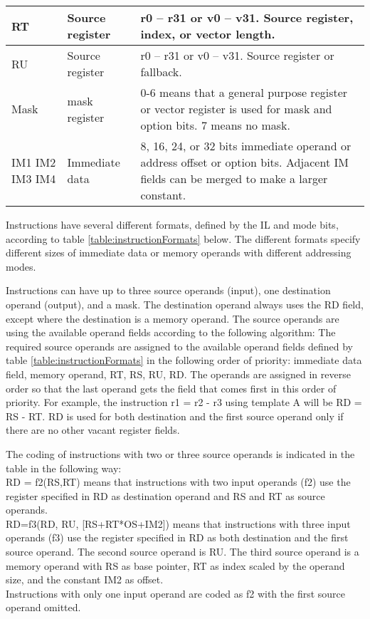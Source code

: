 \documentclass[forwardcom.tex]{subfiles}
\begin{document}
\begin{longtable} {|p{16mm}|p{16mm}|p{85mm}|}
\hline
RT & Source register & r0 – r31 or v0 – v31. Source register, index, or vector length.  \\
\hline
RU & Source register & r0 – r31 or v0 – v31. Source register or fallback. \\
\hline
Mask & mask register & 0-6 means that a general purpose register or vector register is used for mask and option bits. 7 means no mask.  \\
\hline
IM1 IM2 IM3 IM4 & Immediate data & 8, 16, 24, or 32 bits immediate operand or address offset or option bits. Adjacent IM fields can be merged to make a larger constant. \\
\hline
\end{longtable}
\vv

Instructions have several different formats, defined by the IL and mode bits, according to  table \ref{table:instructionFormats} below. The different formats specify different sizes of immediate data or memory operands with different addressing modes. \\
\vv

Instructions can have up to three source operands (input), one destination operand (output), and a mask. The destination operand always uses the RD field, except where the destination is a memory operand. The source operands are using the available operand fields according to the following algorithm: The required source operands are assigned to the available
operand fields defined by table \ref{table:instructionFormats} in the following order of priority: immediate data field, memory operand, RT, RS, RU, RD. 
The operands are assigned in reverse order so that the last operand gets the field that comes first in this order of priority. For example, the instruction r1 = r2 - r3 using template A will be RD = RS - RT. RD is used for both destination and the first source operand only if there are no other vacant register fields.
\vv

The coding of instructions with two or three source operands is indicated in the table in the following way: \\
RD = f2(RS,RT)  means that instructions with two input operands (f2) use the register specified in RD as destination operand and RS and RT as source operands.\\
RD=f3(RD, RU, [RS+RT*OS+IM2])  means that instructions with three input operands (f3) use the register specified in RD as both destination and the first source operand. The second source operand is RU. The third source operand is a memory operand with RS as base pointer, RT as index scaled by the operand size, and the constant IM2 as offset.\\
Instructions with only one input operand are coded as f2 with the first source operand omitted.
\end{document}
